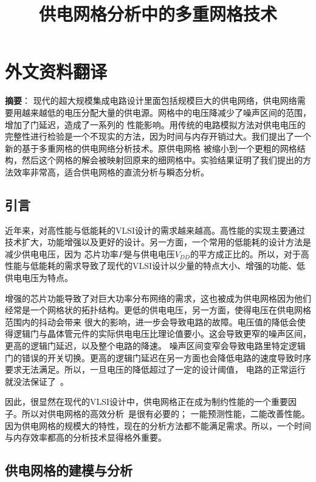 \chapter{外文资料翻译}
\label{cha:engorg}

\title{供电网格分析中的多重网格技术}

\textbf{摘要}：
现代的超大规模集成电路设计里面包括规模巨大的供电网络，供电网络需要用越来越低的电压分配大量的供电源。网格中的电压降减少了噪声区间的范围，增加了门延迟，造成了一系列的
性能影响。用传统的电路模拟方法对供电电压的完整性进行检验是一个不现实的方法，因为时间与内存开销过大。我们提出了一个新的基于多重网格的供电网络分析技术。原供电网格
被缩小到一个更粗的网格结构，然后这个网格的解会被映射回原来的细网格中。实验结果证明了我们提出的方法效率非常高，适合供电网格的直流分析与瞬态分析。

\section{引言}

近年来，对高性能与低能耗的VLSI设计的需求越来越高。高性能的实现主要通过技术扩大，功能增强以及更好的设计。另一方面，一个常用的低能耗的设计方法是减少供电电压，因为
芯片功率$P$是与供电电压$V_{DD}$的平方成正比的。所以，对于高性能与低能耗的需求导致了现代的VLSI设计以少量的特点大小、增强的功能、低供电电压为特点。

增强的芯片功能导致了对巨大功率分布网络的需求，这也被成为供电网格因为他们经常是一个网格状的拓扑结构。更低的供电电压，另一方面，使得电压在供电网格范围内的抖动会带来
很大的影响，进一步会导致电路的故障。电压值的降低会使得逻辑门与晶体管元件的实际供电电压比理论值要小。这会导致更窄的噪声区间，更高的逻辑门延迟，以及整个电路的降速。
噪声区间变窄会导致电路里特定逻辑门的错误的开关切换。更高的逻辑门延迟在另一方面也会降低电路的速度导致时序要求无法满足。所以，一旦电压的降低超过了一定的设计阈值，
电路的正常运行就没法保证了~\cite{dharchoudhury1998design, yim1999floorplan, steele1998full}。

因此，很显然在现代的VLSI设计中，供电网格正在成为制约性能的一个重要因子。所以对供电网格的高效分析~\cite{nassif2000fast, zhao2002hierarchical}是很有必要的；
一能预测性能，二能改善性能。因为供电网格的规模大的特性，现在的分析方法都不能满足需求。所以，一个时间与内存效率都高的分析技术显得格外重要。

\section{供电网格的建模与分析}

